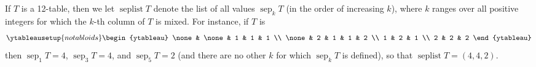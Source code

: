 \documentclass[numbers=enddot,12pt,final,onecolumn,notitlepage]{scrartcl}%
\theoremstyle{definition}
\begin{document}
If $T$ is a 12-table, then we let $\operatorname*{seplist}T$ denote the list
of all values $\operatorname*{sep}\nolimits_{k}T$ (in the order of increasing
$k$), where $k$ ranges over all positive integers for which the $k$-th column
of $T$ is mixed. For instance, if $T$ is
\[
%
\ytableausetup{notabloids}
\begin{ytableau}
\none& \none& 1 & 1 & 1 \\
\none& 2 & 1 & 1 & 2 \\
1 & 2 & 1 \\
2 & 2 & 2
\end{ytableau}%
\]
then $\operatorname*{sep}\nolimits_{1}T=4$, $\operatorname*{sep}\nolimits_{3}T=4$, and
$\operatorname*{sep}\nolimits_{5}T=2$ (and there are no other $k$ for which $\operatorname*{sep}\nolimits_{k}T$ is defined), so that $\operatorname*{seplist}T=\left(  4,4,2\right)  $.
\end{document}

